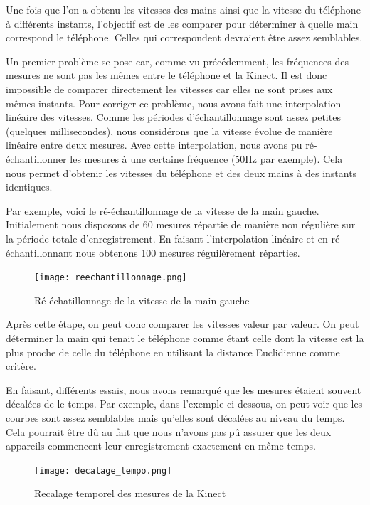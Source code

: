 \documentclass[12pt, french]{article}
\begin{document}
Une fois que l'on a obtenu les vitesses des mains ainsi que la vitesse du téléphone à différents instants, l'objectif est de les comparer pour déterminer à quelle main correspond le téléphone. Celles qui correspondent devraient être assez semblables.

Un premier problème se pose car, comme vu précédemment, les fréquences des mesures ne sont pas les mêmes entre le téléphone et la Kinect. Il est donc impossible de comparer directement les vitesses car elles ne sont prises aux mêmes instants. Pour corriger ce problème, nous avons fait une interpolation linéaire des vitesses. Comme les périodes d'échantillonnage sont assez petites (quelques millisecondes), nous considérons que la vitesse évolue de manière linéaire entre deux mesures. Avec cette interpolation, nous avons pu  ré-échantillonner les mesures à une certaine fréquence (50Hz par exemple). Cela nous permet  d'obtenir les vitesses du téléphone et des deux mains à des instants identiques.

Par exemple, voici le ré-échantillonnage de la vitesse de la main gauche. Initialement nous disposons de 60 mesures répartie de manière non régulière sur la période totale d'enregistrement. En faisant l'interpolation linéaire et en ré-échantillonnant nous obtenons 100 mesures réguilèrement réparties.

\begin{figure}[h]
\centering
\texttt{[image: reechantillonnage.png]}
\caption{Ré-échatillonnage de la vitesse de la main gauche}
\label{fig10}
\end{figure}

Après cette étape, on peut donc comparer les vitesses valeur par valeur. On peut déterminer la main qui tenait le téléphone comme étant celle dont la vitesse est la plus proche de celle du téléphone en utilisant la distance Euclidienne comme critère.

En faisant, différents essais, nous avons remarqué que les mesures étaient souvent décalées de le temps. Par exemple, dans l'exemple ci-dessous, on peut voir que les courbes sont assez semblables mais qu'elles sont décalées au niveau du temps. Cela pourrait être dû au fait que nous n'avons pas pû assurer que les deux appareils commencent leur enregistrement exactement en même temps.

\begin{figure}[H]
\centering
\texttt{[image: decalage\_tempo.png]}
\caption{Recalage temporel des mesures de la Kinect}
\label{fig11}
\end{figure}
\end{document}
